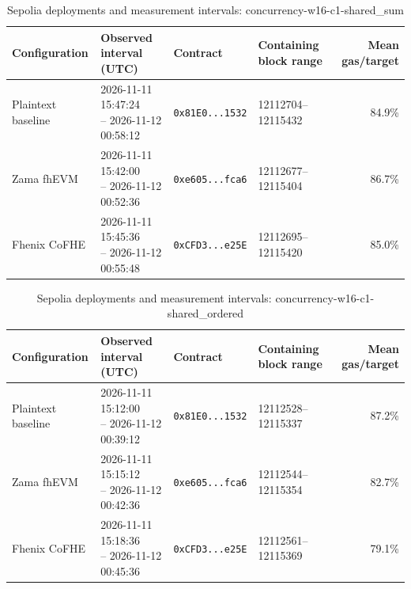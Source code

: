 \begin{table}[!t]
\caption{Sepolia deployments and measurement intervals: concurrency-w16-c1-shared\_sum}
\label{tab:sepolia-concurrency-w16-c1-shared-sum}
\centering
\footnotesize
\setlength{\tabcolsep}{4pt}
\begin{tabular}{|l|l|l|l|r|}
\hline
\textbf{Configuration} & \textbf{Observed interval (UTC)} & \textbf{Contract} & \textbf{Containing block range} & \textbf{Mean gas/target} \\
\hline
Plaintext baseline & \shortstack[l]{2026-11-11 15:47:24 \\ -- 2026-11-12 00:58:12} & \texttt{0x81E0...1532} & 12112704--12115432 & 84.9\% \\
\hline
Zama fhEVM & \shortstack[l]{2026-11-11 15:42:00 \\ -- 2026-11-12 00:52:36} & \texttt{0xe605...fca6} & 12112677--12115404 & 86.7\% \\
\hline
Fhenix CoFHE & \shortstack[l]{2026-11-11 15:45:36 \\ -- 2026-11-12 00:55:48} & \texttt{0xCFD3...e25E} & 12112695--12115420 & 85.0\% \\
\hline
\end{tabular}
\end{table}

\begin{table}[!t]
\caption{Sepolia deployments and measurement intervals: concurrency-w16-c1-shared\_ordered}
\label{tab:sepolia-concurrency-w16-c1-shared-ordered}
\centering
\footnotesize
\setlength{\tabcolsep}{4pt}
\begin{tabular}{|l|l|l|l|r|}
\hline
\textbf{Configuration} & \textbf{Observed interval (UTC)} & \textbf{Contract} & \textbf{Containing block range} & \textbf{Mean gas/target} \\
\hline
Plaintext baseline & \shortstack[l]{2026-11-11 15:12:00 \\ -- 2026-11-12 00:39:12} & \texttt{0x81E0...1532} & 12112528--12115337 & 87.2\% \\
\hline
Zama fhEVM & \shortstack[l]{2026-11-11 15:15:12 \\ -- 2026-11-12 00:42:36} & \texttt{0xe605...fca6} & 12112544--12115354 & 82.7\% \\
\hline
Fhenix CoFHE & \shortstack[l]{2026-11-11 15:18:36 \\ -- 2026-11-12 00:45:36} & \texttt{0xCFD3...e25E} & 12112561--12115369 & 79.1\% \\
\hline
\end{tabular}
\end{table}


